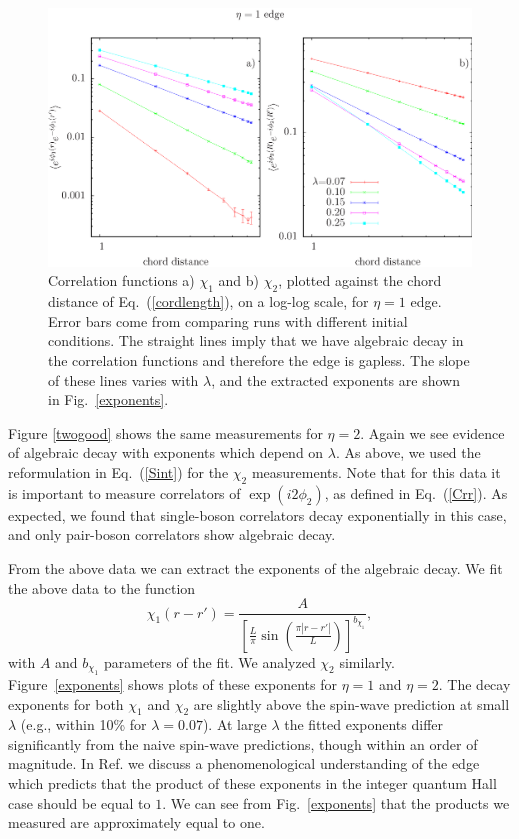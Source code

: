 \begin{figure}
\includegraphics[width=\linewidth]{figures/onecord.eps}
\caption{ Correlation functions a) $\chi_1$ and b) $\chi_2$, plotted against the chord distance of Eq.~(\ref{cordlength}), on a log-log scale, for $\eta=1$ edge.  Error bars come from comparing runs with different initial conditions.  The straight lines imply that we have algebraic decay in the correlation functions and therefore the edge is gapless.  The slope of these lines varies with $\lambda$, and the extracted exponents are shown in Fig.~\ref{exponents}.}
\label{onegood}
\end{figure}

Figure \ref{twogood} shows the same measurements for $\eta=2$. Again we see evidence of algebraic decay with exponents which depend on $\lambda$. As above, we used the reformulation in Eq.~(\ref{Sint}) for the $\chi_2$ measurements. Note that for this data it is important to measure correlators of $\exp(i2\phi_2)$, as defined in Eq.~(\ref{Crr}). As expected, we found that single-boson correlators decay exponentially in this case, and only pair-boson correlators show algebraic decay.


From the above data we can extract the exponents of the algebraic decay. We fit the above data to the function
\begin{equation}
\chi_1(r-r')=\frac{A}{\left[\frac{L}{\pi}\sin\left(\frac{\pi|r-r'|}{L}\right)\right]^{b_{\chi_1}}},
\label{fitfunction}
\end{equation}
with $A$ and $b_{\chi_1}$ parameters of the fit. We analyzed $\chi_2$ similarly.  Figure~\ref{exponents} shows plots of these exponents for $\eta=1$ and $\eta=2$. The decay exponents for both $\chi_1$ and $\chi_2$ are slightly above the spin-wave prediction at small $\lambda$ (e.g., within 10\% for $\lambda =0.07$). At large $\lambda$ the fitted exponents differ significantly from the naive spin-wave predictions, though within an order of magnitude. 
In Ref.\cite{FQHE}
 we discuss a phenomenological understanding of the edge which predicts that the product of these exponents in the integer quantum Hall case should be equal to $1$.
We can see from Fig.~\ref{exponents} that the products we measured are approximately equal to one.

